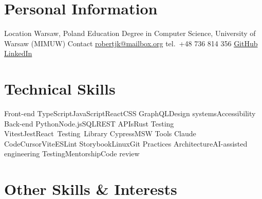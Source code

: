 

\section{Personal Information}

\begin{sectionlist}
    \sectionlistitem
        {Location}
        {Warsaw, Poland}
    \sectionlistitem
        {Education}
        {
            Degree in Computer Science, University of Warsaw (MIMUW)
        }
    \sectionlistitem
        {Contact}
        {
            \href{mailto:robertjk@mailbox.org}{robertjk@mailbox.org}\inlinesep
            tel.~+48 736 814 356\inlinesep
            \href{https://github.com/robertjk}{GitHub}\inlinesep
            \href{https://www.linkedin.com/in/robert-kusznier}{LinkedIn}
        }
\end{sectionlist}


\section{Technical Skills}

\begin{sectionlist}
    \sectionlistitem
        {Front-end}
        {TypeScript\inlinesep JavaScript\inlinesep React\inlinesep CSS\inlinesep
        GraphQL\inlinesep Design systems\inlinesep Accessibility }
    \sectionlistitem
        {Back-end}
        {Python\inlinesep Node.js\inlinesep SQL\inlinesep REST
        APIs\inlinesep Rust}
    \sectionlistitem
        {Testing}
        {Vitest\inlinesep Jest\inlinesep React~Testing~Library\inlinesep
        Cypress\inlinesep MSW}
    \sectionlistitem
        {Tools}
        {Claude Code\inlinesep Cursor\inlinesep Vite\inlinesep ESLint\inlinesep
        Storybook\inlinesep Linux\inlinesep Git}
    \sectionlistitem
        {Practices}
        {Architecture\inlinesep AI-assisted engineering\inlinesep
        Testing\inlinesep Mentorship\inlinesep Code review}
\end{sectionlist}


\section{Other Skills \& Interests}


